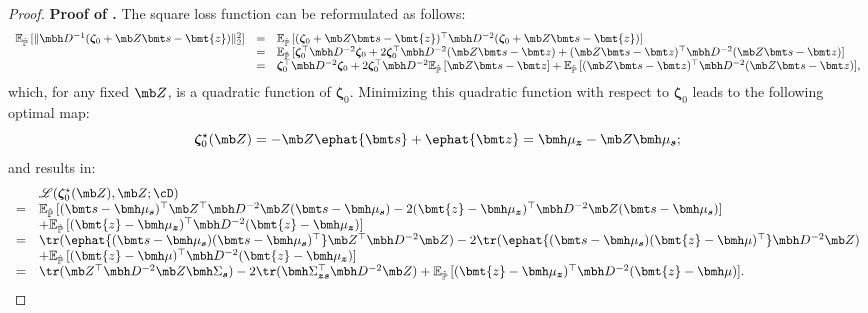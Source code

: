 \documentclass[opre, blindrev]{informs4}
\newcommand{\1}[1]{\mathds{1}{\left(#1\right)}}
\begin{document}
\begin{appendices}
\begin{proof}{\bf Proof of .}
The square loss function can be reformulated as follows:
\[
\begin{array}{rcl}
\mathbb{E}_{\hat{\mathbb{P}}}\,[\|\mbh D^{-1}(\bm \zeta_0 + \mb Z \bmt s - \bmt{z})\|^2_2] 
& = & \mathbb{E}_{\hat{\mathbb{P}}}\,[(\bm \zeta_0 + \mb Z \bmt s - \bmt{z})^{\top} \mbh D^{-2} (\bm \zeta_0 + \mb Z \bmt s - \bmt{z})] \\
& = & \mathbb{E}_{\hat{\mathbb{P}}}\,[\bm \zeta_0^\top \mbh D^{-2} \bm \zeta_0 + 2 \bm \zeta_0^{\top} \mbh D^{-2} (\mb Z \bmt s - \bmt z) + (\mb Z \bmt s - \bmt z)^{\top} \mbh D^{-2} (\mb Z \bmt s - \bmt z)] \\
& = & \bm \zeta_0^\top \mbh D^{-2} \bm \zeta_0 + 2 \bm \zeta_0^{\top} \mbh D^{-2} \mathbb{E}_{\hat{\mathbb{P}}}\,[\mb Z \bmt s - \bmt z] + \mathbb{E}_{\hat{\mathbb{P}}}\,[(\mb Z \bmt s - \bmt z)^{\top} \mbh D^{-2} (\mb Z \bmt s - \bmt z)],
\end{array}
\]
which, for any fixed $\mb Z$, is a quadratic function of $\bm \zeta_0$. Minimizing this quadratic function with respect to $\bm \zeta_0$ leads to the following optimal map:
$$
\bm \zeta_0^\star (\mb Z) = - \mb Z \ephat{\bmt s} + \ephat{\bmt z} = \bmh \mu_{\bm z} - \mb Z \bmh \mu_{\bm s};
$$ 
and results in:
\begin{equation}
\begin{array}{cl}
& \mathscr{L}(\bm \zeta_0^\star (\mb Z),\mb Z; \cD) \\
= & \mathbb{E}_{\hat{\mathbb{P}}}\,[(\bmt s - \bmh \mu_{\bm s} )^\top \mb Z^{\top} \mbh D^{-2} \mb Z (\bmt s - \bmh \mu_{\bm s} ) -2 ( \bmt{z} - \bmh \mu_{\bm z} )^\top \mbh D^{-2} \mb Z (\bmt s - \bmh \mu_{\bm s})] \\
  & + \mathbb{E}_{\hat{\mathbb{P}}}\,[(\bmt{z} - \bmh \mu_{\bm z} )^\top \mbh D^{-2} ( \bmt{z} - \bmh \mu_{\bm z})] \\
= & \tr(\ephat{(\bmt s - \bmh \mu_{\bm s})(\bmt s - \bmh \mu_{\bm s})^\top} \mb Z^{\top} \mbh D^{-2} \mb Z) - 2 \tr(\ephat{(\bmt s - \bmh \mu_{\bm s})(\bmt{z} - \bmh \mu )^\top}\mbh D^{-2} \mb Z) \\
  & + \mathbb{E}_{\hat{\mathbb{P}}}\,[(\bmt{z} - \bmh \mu)^\top \mbh D^{-2} (\bmt{z} - \bmh \mu_{\bm z})] \\
= & \tr(\mb Z^{\top} \mbh D^{-2} \mb Z \bmh \Sigma_{\bm s}) - 2 \tr(\bmh \Sigma_{\bm z \bm s}^\top \mbh D^{-2} \mb Z)  + \mathbb{E}_{\hat{\mathbb{P}}}\,[(\bmt{z} - \bmh \mu_{\bm z})^\top \mbh D^{-2}(\bmt{z} - \bmh \mu)].
\end{array}

\end{equation}
\end{proof}
\end{appendices}
\end{document}
